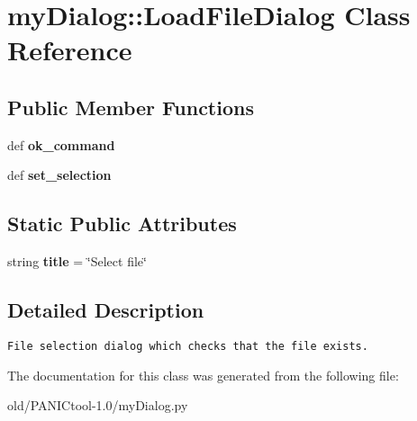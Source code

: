 \section{my\-Dialog::Load\-File\-Dialog Class Reference}
\label{classmyDialog_1_1LoadFileDialog}
\subsection*{Public Member Functions}
\begin{CompactItemize}
\item 
def \textbf{ok\_\-command}\label{classmyDialog_1_1LoadFileDialog_8771af75ebd18a9a322b99866d9f53fe}

\item 
def \textbf{set\_\-selection}\label{classmyDialog_1_1LoadFileDialog_55873cecd8773946e8b0d092d504e162}

\end{CompactItemize}
\subsection*{Static Public Attributes}
\begin{CompactItemize}
\item 
string \textbf{title} = \char`\"{}Select file\char`\"{}\label{classmyDialog_1_1LoadFileDialog_83bc8cda6dc52152e7ec95081ceb29a2}

\end{CompactItemize}


\subsection{Detailed Description}


\footnotesize\begin{verbatim}File selection dialog which checks that the file exists.\end{verbatim}
\normalsize
 



The documentation for this class was generated from the following file:\begin{CompactItemize}
\item 
old/PANICtool-1.0/my\-Dialog.py\end{CompactItemize}
